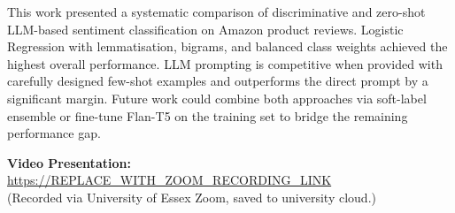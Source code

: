 \documentclass[10pt,twocolumn]{article}
\begin{document}
This work presented a systematic comparison of discriminative and
zero-shot LLM-based sentiment classification on Amazon product reviews.
Logistic Regression with lemmatisation, bigrams, and balanced class weights
achieved the highest overall performance.
LLM prompting is competitive when provided with carefully designed few-shot
examples and outperforms the direct prompt by a significant margin.
Future work could combine both approaches via soft-label ensemble or
fine-tune Flan-T5 on the training set to bridge the remaining performance gap.

\vspace{6pt}
\noindent\textbf{Video Presentation:}
\url{https://REPLACE_WITH_ZOOM_RECORDING_LINK}\\
(Recorded via University of Essex Zoom, saved to university cloud.)



\end{document}
